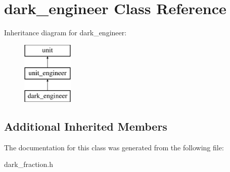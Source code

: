 \hypertarget{classdark__engineer}{}\section{dark\+\_\+engineer Class Reference}
\label{classdark__engineer}
Inheritance diagram for dark\+\_\+engineer\+:\begin{figure}[H]
\begin{center}
\leavevmode
\includegraphics[height=3.000000cm]{classdark__engineer}
\end{center}
\end{figure}
\subsection*{Additional Inherited Members}


The documentation for this class was generated from the following file\+:\begin{DoxyCompactItemize}
\item 
dark\+\_\+fraction.\+h\end{DoxyCompactItemize}
